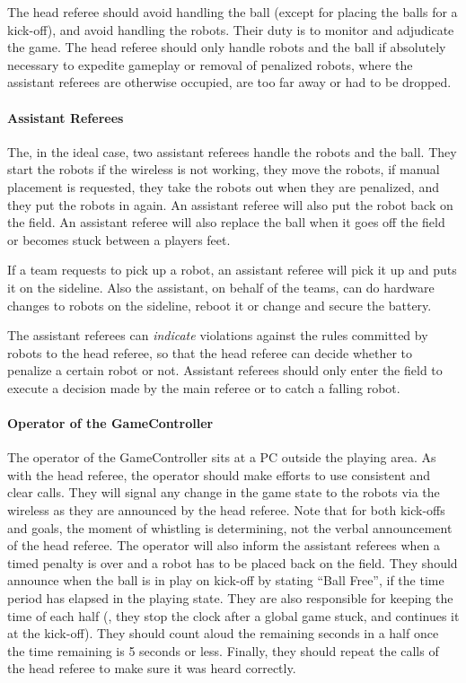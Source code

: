 The head referee should avoid handling the ball (except for placing the balls for a kick-off), and avoid handling the robots.
Their duty is to monitor and adjudicate the game.
The head referee should only handle robots and the ball if absolutely necessary to expedite gameplay or removal of penalized robots, where the assistant referees are otherwise occupied, are too far away or had to be dropped.

\paragraph{Assistant Referees}
\label{sec:assist_referee}
The, in the ideal case, two assistant referees handle the robots and the ball. They start the robots if the wireless is not working, they move the robots, if manual placement is requested, they take the robots out when they are penalized, and they put the robots in again. An assistant referee will also put the robot back on the field. An assistant referee will also replace the ball when it goes off the field or becomes stuck between a players feet.

If a team requests to pick up a robot, an assistant referee will pick it up and puts it on the sideline. Also the assistant, on behalf of the teams, can do hardware changes to robots on the sideline, \ie reboot it or change and secure the battery. 

The assistant referees can \textit{indicate} violations against the rules committed by robots to the head referee, so that the head referee can decide whether to penalize a certain robot or not. Assistant referees should only enter the field to execute a decision made by the main referee or to catch a falling robot.

\paragraph{Operator of the GameController}
\label{sec:gameControllerOp}
The operator of the GameController sits at a PC outside the playing area.
As with the head referee, the operator should make efforts to use consistent and clear calls.
They will signal any change in the game state to the robots via the wireless as they are announced by the head referee.
Note that for both kick-offs and goals, the moment of whistling is determining, not the verbal announcement of the head referee.
The operator will also inform the assistant referees when a timed penalty is over and a robot has to be placed back on the field.
They should announce when the ball is in play on kick-off by stating ``Ball Free'', if the \KickOffBallFreeTime time period has elapsed in the playing state.
They are also responsible for keeping the time of each half (\ie, they stop the clock after a global game stuck, and continues it at the kick-off).
They should count aloud the remaining seconds in a half once the time remaining is 5 seconds or less.
Finally, they should repeat the calls of the head referee to make sure it was heard correctly.

